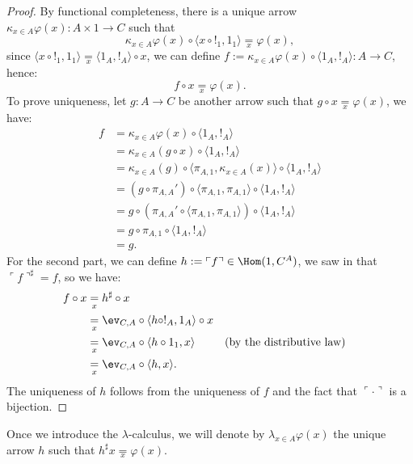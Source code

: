 \begin{proof}
    By functional completeness, there is a unique arrow $\kappa_{x \in A} \varphi(x) : A \times 1 \to C$ such that
    \[ \kappa_{x \in A} \varphi(x) \circ \langle x \circ !_1, 1_1\rangle \underset{x}{=} \varphi(x), \]
    since $\langle x \circ !_1, 1_1\rangle \underset{x}{=} \langle 1_A, !_A \rangle \circ x$, we can define $f := \kappa_{x \in A} \varphi(x) \circ \langle 1_A, !_A \rangle : A \to C$, hence:
    \[ f \circ x \underset{x}{=} \varphi(x). \]
    To prove uniqueness, let $g : A \to C$ be another arrow such that $g \circ x \underset{x}{=} \varphi(x)$, we have:
    \begin{align*}
        f &= \kappa_{x \in A}\varphi(x) \circ \langle 1_A,!_A\rangle \\
          &= \kappa_{x \in A}(g \circ x) \circ \langle 1_A,!_A\rangle \\
          &= \kappa_{x \in A}(g) \circ \langle \pi_{A,1},\kappa_{x \in A}(x)\rangle \circ \langle 1_A,!_A\rangle \\
          &= (g \circ \pi_{A,A}') \circ \langle \pi_{A,1},\pi_{A,1}\rangle \circ \langle 1_A,!_A\rangle \\
          &= g \circ (\pi_{A,A}' \circ \langle \pi_{A,1},\pi_{A,1}\rangle) \circ \langle 1_A,!_A\rangle \\
          &= g \circ \pi_{A,1} \circ \langle 1_A,!_A\rangle \\
          &= g.
    \end{align*}
    For the second part, we can define $h := \ulcorner f \urcorner \in \Hom(1,C^A)$, we saw in  that $\ulcorner f \urcorner^\sharp = f$, so we have:
    \begin{align*}
        f \circ x &\underset{x}{=} h^\sharp \circ x \\    
                  &\underset{x}{=} \ev_{C,A} \circ \langle h \circ !_A,1_A \rangle \circ x \\
                  &\underset{x}{=} \ev_{C,A} \circ \langle h \circ 1_1, x \rangle &&(\textnormal{by the distributive law})\\
                  &\underset{x}{=} \ev_{C,A} \circ \langle h, x \rangle.
    \end{align*}
    The uniqueness of $h$ follows from the uniqueness of $f$ and the fact that $\ulcorner \cdot \urcorner$ is a bijection.
\end{proof}

\begin{remark}
    Once we introduce the $\lambda$-calculus, we will denote by $\lambda_{x \in A} \varphi(x)$ the unique arrow $h$ such that $h^\sharp x \underset{x}{=} \varphi(x)$.
\end{remark}
